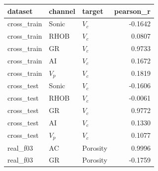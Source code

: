 \begin{tabular}{lllr}
\toprule
dataset & channel & target & pearson\_r \\
\midrule
cross\_train & Sonic & $V_c$ & -0.1642 \\
cross\_train & RHOB & $V_c$ & 0.0807 \\
cross\_train & GR & $V_c$ & 0.9733 \\
cross\_train & AI & $V_c$ & 0.1672 \\
cross\_train & $V_p$ & $V_c$ & 0.1819 \\
cross\_test & Sonic & $V_c$ & -0.1606 \\
cross\_test & RHOB & $V_c$ & -0.0061 \\
cross\_test & GR & $V_c$ & 0.9772 \\
cross\_test & AI & $V_c$ & 0.1330 \\
cross\_test & $V_p$ & $V_c$ & 0.1077 \\
real\_f03 & AC & Porosity & 0.9996 \\
real\_f03 & GR & Porosity & -0.1759 \\
\bottomrule
\end{tabular}

